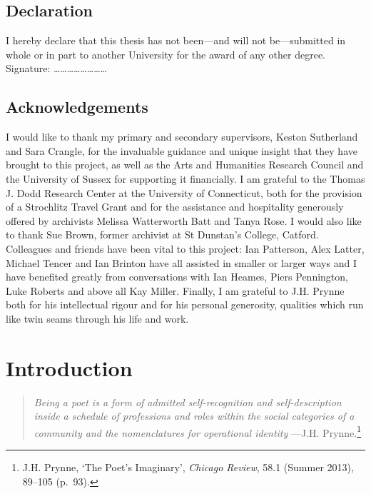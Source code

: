 \documentclass[]{article}
\begin{document}
\subsection{Declaration}\label{declaration}

\noindent I hereby declare that this thesis has not been---and will not
be---submitted in whole or in part to another University for the award
of any other degree. \newline
\noindent Signature:
\ldots{}\ldots{}\ldots{}\ldots{}\ldots{}\ldots{}\ldots{}\ldots{}
\newpage

\subsection{Acknowledgements}\label{acknowledgements}

I would like to thank my primary and secondary supervisors, Keston
Sutherland and Sara Crangle, for the invaluable guidance and unique
insight that they have brought to this project, as well as the Arts and
Humanities Research Council and the University of Sussex for supporting
it financially. I am grateful to the Thomas J. Dodd Research Center at
the University of Connecticut, both for the provision of a Strochlitz
Travel Grant and for the assistance and hospitality generously offered
by archivists Melissa Watterworth Batt and Tanya Rose. I would also like
to thank Sue Brown, former archivist at St Dunstan's College, Catford.
Colleagues and friends have been vital to this project: Ian Patterson,
Alex Latter, Michael Tencer and Ian Brinton have all assisted in smaller
or larger ways and I have benefited greatly from conversations with Ian
Heames, Piers Pennington, Luke Roberts and above all Kay Miller.
Finally, I am grateful to J.H. Prynne both for his intellectual rigour
and for his personal generosity, qualities which run like twin seams
through his life and work. \newpage

\section{Introduction}\label{introduction}

\begin{quote}
\emph{Being a poet is a form of admitted self-recognition and
self-description inside a schedule of professions and roles within the
social categories of a community and the nomenclatures for operational
identity} ---J.H. Prynne.\footnote{J.H. Prynne, `The Poet's Imaginary',
  \emph{Chicago Review}, 58.1 (Summer 2013), 89--105 (p.~93).}
\end{quote}
\end{document}
